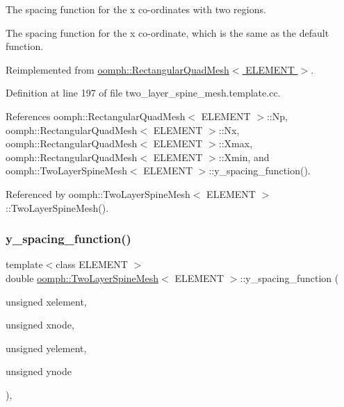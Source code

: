 The spacing function for the x co-\/ordinates with two regions. 

The spacing function for the x co-\/ordinate, which is the same as the default function. 

Reimplemented from \hyperlink{classoomph_1_1RectangularQuadMesh_ad4c2f349cf201cb3107f0a4e5447c16f}{oomph\+::\+Rectangular\+Quad\+Mesh$<$ E\+L\+E\+M\+E\+N\+T $>$}.



Definition at line 197 of file two\+\_\+layer\+\_\+spine\+\_\+mesh.\+template.\+cc.



References oomph\+::\+Rectangular\+Quad\+Mesh$<$ E\+L\+E\+M\+E\+N\+T $>$\+::\+Np, oomph\+::\+Rectangular\+Quad\+Mesh$<$ E\+L\+E\+M\+E\+N\+T $>$\+::\+Nx, oomph\+::\+Rectangular\+Quad\+Mesh$<$ E\+L\+E\+M\+E\+N\+T $>$\+::\+Xmax, oomph\+::\+Rectangular\+Quad\+Mesh$<$ E\+L\+E\+M\+E\+N\+T $>$\+::\+Xmin, and oomph\+::\+Two\+Layer\+Spine\+Mesh$<$ E\+L\+E\+M\+E\+N\+T $>$\+::y\+\_\+spacing\+\_\+function().



Referenced by oomph\+::\+Two\+Layer\+Spine\+Mesh$<$ E\+L\+E\+M\+E\+N\+T $>$\+::\+Two\+Layer\+Spine\+Mesh().

\mbox{\label{classoomph_1_1TwoLayerSpineMesh_a2d05d5228e3831021ab48dd429ada890}} 
\subsubsection{\texorpdfstring{y\+\_\+spacing\+\_\+function()}{y\_spacing\_function()}}
{\footnotesize\ttfamily template$<$class E\+L\+E\+M\+E\+NT $>$ \\
double \hyperlink{classoomph_1_1TwoLayerSpineMesh}{oomph\+::\+Two\+Layer\+Spine\+Mesh}$<$ E\+L\+E\+M\+E\+NT $>$\+::y\+\_\+spacing\+\_\+function (\begin{DoxyParamCaption}\item[{unsigned}]{xelement,  }\item[{unsigned}]{xnode,  }\item[{unsigned}]{yelement,  }\item[{unsigned}]{ynode }\end{DoxyParamCaption})\hspace{0.3cm}{\ttfamily [protected]}, {\ttfamily [virtual]}}



